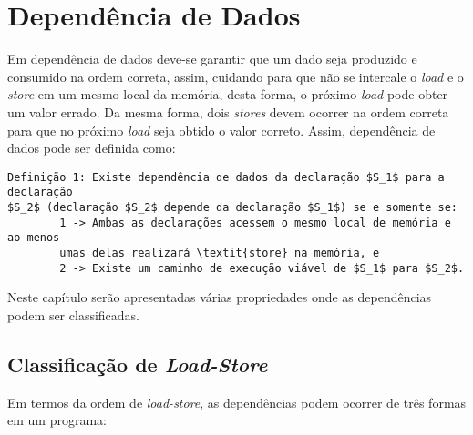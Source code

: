 \section{Dependência de Dados}

Em dependência de dados deve-se garantir que um dado seja produzido e consumido
na ordem correta, assim, cuidando para que não se intercale o \textit{load} e o
\textit{store} em um mesmo local da memória, desta forma, o próximo
\textit{load} pode obter um valor errado. 
Da mesma forma, dois \textit{stores} devem ocorrer na ordem correta para 
que no próximo \textit{load} seja obtido o valor correto.
Assim, dependência de dados pode ser definida como:

\begin{verbatim}
Definição 1: Existe dependência de dados da declaração $S_1$ para a declaração 
$S_2$ (declaração $S_2$ depende da declaração $S_1$) se e somente se:
        1 -> Ambas as declarações acessem o mesmo local de memória e ao menos
        umas delas realizará \textit{store} na memória, e
        2 -> Existe um caminho de execução viável de $S_1$ para $S_2$.
\end{verbatim}

Neste capítulo serão apresentadas várias propriedades onde as dependências 
podem ser classificadas.


\subsection{Classificação de \textit{Load-Store}}

Em termos da ordem de \textit{load-store}, as dependências podem ocorrer de 
três formas em um programa:

